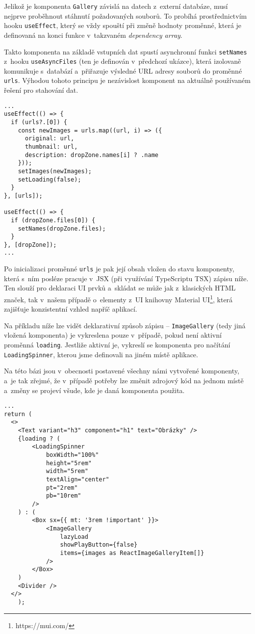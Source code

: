 Jelikož je komponenta \verb|Gallery| závislá na datech z~externí databáze, musí nejprve proběhnout stáhnutí požadovaných souborů. To probíhá prostřednictvím hooku \verb|useEffect|, který se vždy spouští při změně hodnoty proměnné, která je definovaná na konci funkce v~takzvaném \emph{dependency array}.

Takto komponenta na základě vstupních dat spustí asynchronní funkci \verb|setNames| z~hooku \verb|useAsyncFiles| (ten je definován v~předchozí ukázce), která izolovaně komunikuje s~databází a~přiřazuje výsledné URL adresy souborů do proměnné \verb|urls|. Výhodou tohoto principu je nezávislost komponent na aktuálně používaném řešení pro stahování dat.

\begin{verbatim}
...
useEffect(() => {
  if (urls?.[0]) {
    const newImages = urls.map((url, i) => ({
      original: url,
      thumbnail: url,
      description: dropZone.names[i] ? .name
    }));
    setImages(newImages);
    setLoading(false);
  }
}, [urls]);

useEffect(() => {
  if (dropZone.files[0]) {
    setNames(dropZone.files);
  }
}, [dropZone]);
...
\end{verbatim}

Po inicializaci proměnné \verb|urls| je pak její obsah vložen do stavu komponenty, která s~ním posléze pracuje v~JSX (při využívání TypeScriptu TSX) zápisu níže. Ten slouží pro deklaraci UI prvků a~skládat se může jak z~klasických HTML značek, tak v~našem případě o~elementy z~UI knihovny Material UI\footnote{https://mui.com/}, která zajišťuje konzistentní vzhled napříč aplikací.

Na příkladu níže lze vidět deklarativní způsob zápisu -- \verb|ImageGallery| (tedy jiná vložená komponenta) je vykreslena pouze v~případě, pokud není aktivní proměnná \verb|loading|. Jestliže aktivní je, vykreslí se komponenta pro načítání \verb|LoadingSpinner|, kterou jsme definovali na jiném místě aplikace.

Na této bázi jsou v~obecnosti postavené všechny námi vytvořené komponenty, a~je tak zřejmé, že v~případě potřeby lze změnit zdrojový kód na jednom místě a~změny se projeví všude, kde je daná komponenta použita.

\begin{verbatim}
...
return (
  <>
    <Text variant="h3" component="h1" text="Obrázky" />
    {loading ? (
        <LoadingSpinner
            boxWidth="100%"
            height="5rem"
            width="5rem"
            textAlign="center"
            pt="2rem"
            pb="10rem"
        />
    ) : (
        <Box sx={{ mt: '3rem !important' }}>
            <ImageGallery
                lazyLoad
                showPlayButton={false}
                items={images as ReactImageGalleryItem[]}
            />
        </Box>
    ) 
    <Divider />
  </>
    );
\end{verbatim}

